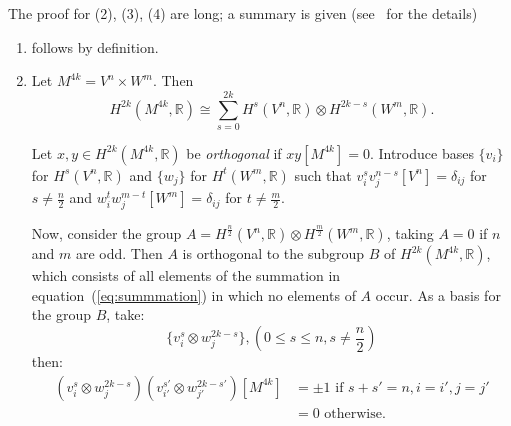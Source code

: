 \documentclass{ut-thesis}
\newenvironment{Proof}[1][]
  {\begin{ProofTcb}[#1]}
  {\end{ProofTcb}}
\newcommand{\R}{{\mathbb{R}}}
\begin{document}
\begin{Proof}
  The proof for (2), (3), (4) are long; a summary is given
(see~\cite{thomQuelquesProprietesGlobales1964} for the details)
\begin{enumerate}
  \item follows by definition.

  \item Let $M^{4k} = V^n \times W^m$. Then
    \begin{equation}\label{eq:summmation}
    H^{2k}(M^{4k}, \R) \cong \sum_{s=0}^{2k} H^s(V^n, \R) \otimes H^{2k-s}(W^m, \R).
\end{equation}

 Let $x, y \in H^{2k}(M^{4k}, \R)$ be \emph{orthogonal} if $x y[M^{4k}] = 0$. Introduce bases $\{v_i\}$ for
 $H^s(V^n, \R)$ and $\{w_j\}$ for $H^t(W^m, \R)$ such that $v_i^s v_j^{n-s}[V^n] = \delta_{ij}$ for $s \neq
 \frac{n}{2}$ and $w_i^t w_j^{m-t}[W^m] = \delta_{ij}$ for $t \neq \frac{m}{2}$.

Now, consider the group $A = H^{\frac{n}{2}}(V^n, \R) \otimes H^{\frac{m}{2}}(W^m, \R)$, taking $A = 0$ if $n$
and $m$ are odd. Then $A$ is orthogonal to the subgroup $B$ of $H^{2k}(M^{4k}, \R)$, which consists of all
elements of the summation in equation~(\ref{eq:summmation}) in which no elements of $A$ occur. As a basis for
the group $B$, take:
\[
  \{v_i^s \otimes w_j^{2k-s}\}, (0 \leq s \leq n, s \neq \frac{n}{2})
\]
then:
\begin{align*}
(v_i^s \otimes w_j^{2k-s})(v_{i'}^{s'} \otimes w_{j'}^{2k-s'})[M^{4k}] &= \pm 1 \text{ if } s + s' = n, i = i', j = j' \\
&= 0 \text{ otherwise.}
\end{align*}


\end{enumerate}
\end{Proof}
\end{document}
